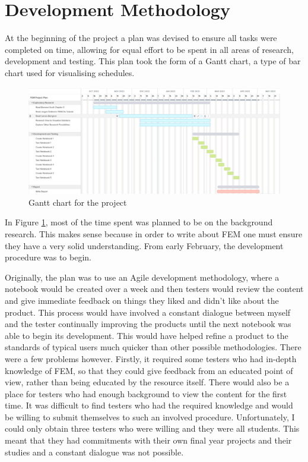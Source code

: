 \section{Development Methodology} \label{section:development-methodology}

At the beginning of the project a plan was devised to ensure all tasks were completed on time, allowing for equal effort to be spent in all areas of research, development and testing. This plan took the form of a Gantt chart, a type of bar chart used for visualising schedules.

\begin{figure}[h]
\centering
\includegraphics[scale=0.39]{./images/misc/gantt_chart}
\caption{Gantt chart for the project} \label{fig:gantt-chart}
\end{figure}

In Figure \ref{fig:gantt-chart}, most of the time spent was planned to be on the background research. This makes sense because in order to write about FEM one must ensure they have a very solid understanding. From early February, the development procedure was to begin.

Originally, the plan was to use an Agile development methodology, where a notebook would be created over a week and then testers would review the content and give immediate feedback on things they liked and didn't like about the product. This process would have involved a constant dialogue between myself and the tester continually improving the products until the next notebook was able to begin its development. This would have helped refine a product to the standards of typical users much quicker than other possible methodologies. There were a few problems however. Firstly, it required some testers who had in-depth knowledge of FEM, so that they could give feedback from an educated point of view, rather than being educated by the resource itself. There would also be a place for testers who had enough background to view the content for the first time. It was difficult to find testers who had the required knowledge and would be willing to submit themselves to such an involved procedure. Unfortunately, I could only obtain three testers who were willing and they were all students. This meant that they had commitments with their own final year projects and their studies and a constant dialogue was not possible.

